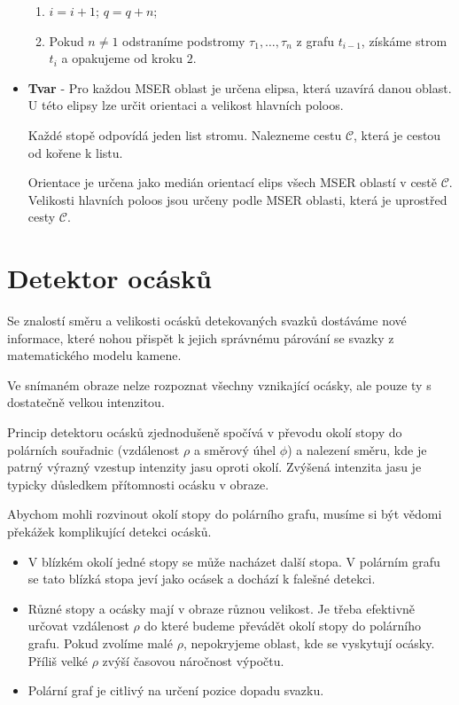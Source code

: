 \begin{itemize}
\begin{enumerate}
	\item $i = i+1$; $q = q+n$;
	\item Pokud $n \neq 1$ odstraníme podstromy $\tau_1,\dots,\tau_n$ z grafu $t_{i-1}$, získáme strom  $t_i$ a opakujeme od kroku $2$. 
	
\end{enumerate}	
	\item \textbf{Tvar} -  Pro každou MSER oblast je určena elipsa, která uzavírá danou oblast. U této elipsy lze určit orientaci a velikost hlavních poloos. 
	
	Každé stopě odpovídá jeden list stromu. Nalezneme cestu $\mathcal{C}$, která je cestou od kořene k listu. 	
	
	Orientace je určena jako medián orientací elips všech MSER oblastí v cestě $\mathcal{C}$. Velikosti hlavních poloos jsou určeny podle MSER oblasti, která je uprostřed cesty $\mathcal{C}$.		
		
\end{itemize}

\newpage
\section{Detektor ocásků}
\label{sec:tails}
	Se znalostí směru a velikosti ocásků detekovaných svazků dostáváme nové informace, které nohou přispět k jejich správnému párování se svazky z matematického modelu kamene.
	
	Ve snímaném obraze nelze rozpoznat všechny vznikající ocásky, ale pouze ty s dostatečně velkou intenzitou.

	Princip detektoru ocásků zjednodušeně spočívá v převodu okolí stopy do polárních souřadnic (vzdálenost $\rho$ a směrový úhel $\phi$) a nalezení směru, kde je patrný výrazný vzestup intenzity jasu oproti okolí. Zvýšená intenzita jasu je typicky důsledkem přítomnosti ocásku v obraze. 
	
	Abychom mohli rozvinout okolí stopy do polárního grafu, musíme si být vědomi překážek komplikující detekci ocásků.
	  
	 \begin{itemize}	 	
	 	\item V blízkém okolí jedné stopy se může nacházet další stopa. V polárním grafu se tato blízká stopa jeví jako ocásek a dochází k falešné detekci.	
	 	\item Různé stopy a ocásky mají v obraze různou velikost. Je třeba efektivně určovat vzdálenost $\rho$ do které budeme převádět okolí stopy do polárního grafu. Pokud zvolíme malé $\rho$, nepokryjeme oblast, kde se vyskytují ocásky. Příliš velké $\rho$ zvýší časovou náročnost výpočtu.   	
	 	\item Polární graf je citlivý na určení pozice dopadu svazku. 
	\end{itemize}
	
